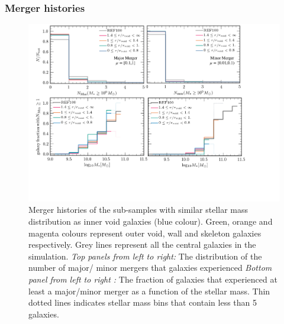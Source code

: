\documentclass[a4paper,fleqn,usenatbib,letter]{mnras}
\begin{document}
\subsubsection{Merger histories}
\begin{figure}	
	\includegraphics[width=2\columnwidth]{plots_stellarmass_central/merger_plot_ssm.pdf}  
    \caption{Merger histories of the sub-samples with similar stellar mass distribution as inner void galaxies (blue colour). Green, orange and magenta colours represent  outer void, wall and skeleton galaxies respectively. Grey lines represent all the central galaxies in the simulation. \textit{Top panels from left to right:} The distribution of the number of major/ minor mergers that galaxies experienced \textit{Bottom panel from left to right :} The fraction of galaxies that experienced at least a major/minor merger as a function of the stellar mass. Thin dotted lines indicates stellar mass bins that contain less than 5 galaxies.}
    \label{fig:mergers_ssm}
\end{figure} 
 
\end{document}
